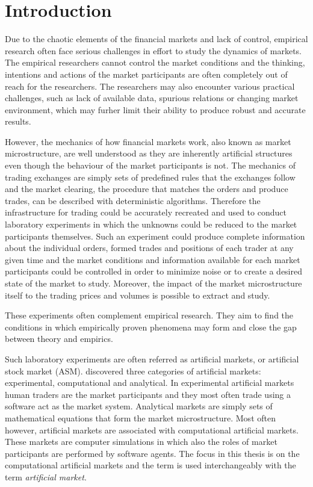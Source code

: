 \section{Introduction}

Due to the chaotic elements of the financial markets and lack of control, 
empirical research often face serious challenges in effort to study the 
dynamics of markets. The empirical researchers cannot control the market conditions 
and the thinking, intentions and actions of the market participants are often completely out of reach
for the researchers. The researchers may also encounter various practical challenges, such as 
lack of available data, spurious relations or changing market environment, 
which may furher limit their ability to produce robust and accurate results. 

However, the mechanics of how financial markets work, also known as market
microstructure, are well understood as they are inherently artificial structures 
even though the behaviour of the market participants is not. 
The mechanics of trading exchanges are simply sets of predefined rules 
that the exchanges follow and the market clearing, the procedure 
that matches the orders and produce trades, can be described with 
deterministic algorithms. Therefore the infrastructure for trading
could be accurately recreated and used to conduct laboratory 
experiments in which the unknowns could be reduced to the market participants
themselves. Such an experiment could produce complete information about
the individual orders, formed trades and positions of each trader at any given time
and the market conditions and information available for each market participants could
be controlled in order to minimize noise or to create a desired state of the market to
study. Moreover, the impact of the market microstructure itself to the trading prices and volumes 
is possible to extract and study. 

These experiments often complement empirical research. They aim to find the
conditions in which empirically proven phenomena may form and close the gap
between theory and empirics. 

Such laboratory experiments are often referred as artificial markets, or artificial
stock market (ASM). \citet{boer05} discovered three categories of artificial markets: 
experimental, computational and analytical. In experimental artificial markets human traders
are the market participants and they most often trade using a software act as
the market system. Analytical markets are simply sets of mathematical equations that
form the market microstructure. Most often however, artificial markets are associated with 
computational artificial markets. These markets are computer simulations in which 
also the roles of market participants are performed by software agents. The focus in this
thesis is on the computational artificial markets and the term is used interchangeably
with the term \textit{artificial market}. 

